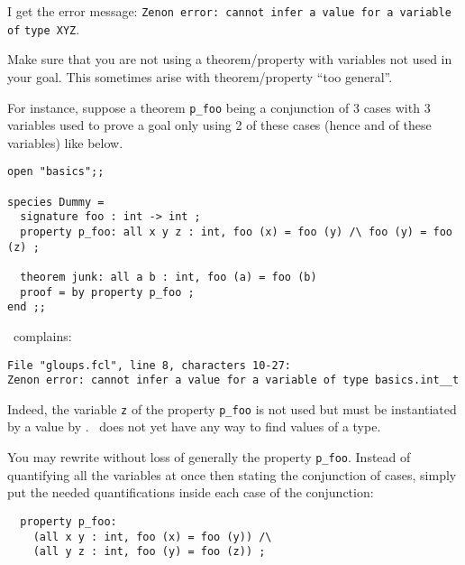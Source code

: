 \documentclass[10pt,a4paper]{article}
\begin{document}
\bigskip
\begin{faqitem}
I get the error message:
\verb+Zenon error: cannot infer a value for a variable of+
\verb+type XYZ+.

\medskip
{}
Make sure that you are not using a theorem/property with variables not
used in your goal. This sometimes arise with theorem/property
``too general''.

For instance, suppose a theorem \lstinline"p_foo" being a conjunction of 3
cases with 3 variables used to prove a goal only using 2 of these cases
(hence and of these variables) like below.

{\small
\begin{lstlisting}
open "basics";;

species Dummy =
  signature foo : int -> int ;
  property p_foo: all x y z : int, foo (x) = foo (y) /\ foo (y) = foo (z) ;

  theorem junk: all a b : int, foo (a) = foo (b)
  proof = by property p_foo ;
end ;;
\end{lstlisting}}

\zenon\ complains:
\begin{verbatim}
File "gloups.fcl", line 8, characters 10-27:
Zenon error: cannot infer a value for a variable of type basics.int__t
\end{verbatim}
Indeed, the variable \lstinline"z" of the property \lstinline"p_foo" is not
used but must be instantiated by a value by \zenon. \zenon\ does not yet have
any way to find values of a type.

You may rewrite without loss of generally the property \lstinline"p_foo".
Instead of quantifying all the variables at once then stating the
conjunction of cases, simply put the needed quantifications inside each
case of the conjunction:

{\small
\begin{lstlisting}
  property p_foo:
    (all x y : int, foo (x) = foo (y)) /\
    (all y z : int, foo (y) = foo (z)) ;
\end{lstlisting}}
\end{faqitem}
\end{document}
